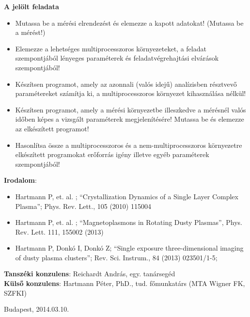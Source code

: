 \begin{flushleft}
\textbf{A jelölt feladata}

\begin{itemize}
	\item Mutassa be a mérési elrendezést és elemezze a kapott adatokat! (Mutassa
	be a mérést!)
	\item Elemezze a lehetséges multiprocesszoros környezeteket, a feladat
	szempontjából lényeges paraméterek és feladatvégrehajtási elvárások szempontjából!
	\item Készítsen programot, amely az azonnali (valós idejű) analízisben résztvevő paramétereket számítja ki, a
	multiprocesszoros környezet kihasználása nélkül!
	\item Készítsen programot, amely a mérési környezetbe illeszkedve a mérésnél
	valós időben képes a vizsgált paraméterek megjelenítésére! Mutassa be és
	elemezze az elkészített programot!
	\item Hasonlítsa össze a multiprocesszoros és a nem-multiprocesszoros
	környezetre elkészített programokat erőforrás igény illetve egyéb paraméterek szempontjából!
\end{itemize}
\end{flushleft}

\begin{flushleft}
\textbf{Irodalom}:
\begin{itemize}
	\item \cite{Hartmann2010} Hartmann P, et. al. ; “Crystallization Dynamics of a Single Layer Complex Plasma”;
	Phys. Rev. Lett., 105 (2010) 115004
	\item \cite{Hartmann2013} Hartmann P, et. al. ; “Magnetoplasmons in Rotating Dusty	Plasmas”, Phys.	Rev. Lett.
	111, 155002 (2013)
	\item \cite{HartmannP2013} Hartmann P, Donkó I, Donkó Z; “Single exposure three-dimensional imaging of dusty
	plasma clusters”; Rev. Sci. Instrum., 84 (2013) 023501/1-5;
\end{itemize}
\end{flushleft}

\begin{flushleft}
\vspace*{1cm}
\textbf{Tanszéki konzulens}: Reichardt András, egy. tanársegéd\\
\textbf{Külső konzulens}: Hartmann Péter, PhD., tud. főmunkatárs (MTA Wigner FK, SZFKI)
\end{flushleft}



\begin{flushleft}
\vspace*{1cm}
Budapest, 2014.03.10.
\end{flushleft}
